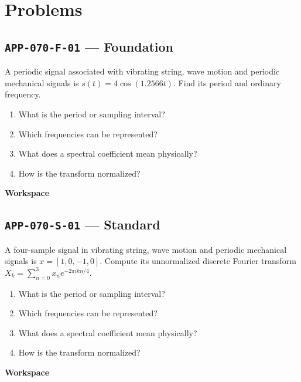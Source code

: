 \documentclass[11pt]{book}
\newcommand{\pid}[1]{\texttt{#1}}
\newcommand{\workspace}{\par\vspace{0.7in}\hrulefill\par\vspace{0.55in}\hrulefill\par}
\begin{document}
\section*{Problems}
\subsection*{\pid{APP-070-F-01} — Foundation}
\begin{problembox}
A periodic signal associated with vibrating string, wave motion and periodic mechanical signals is $s(t)=4\cos(1.2566t)$. Find its period and ordinary frequency.
\end{problembox}
\begin{promptbox}\begin{enumerate}
\item What is the period or sampling interval?
\item Which frequencies can be represented?
\item What does a spectral coefficient mean physically?
\item How is the transform normalized?
\end{enumerate}\end{promptbox}
\textbf{Workspace}\workspace
{}
\subsection*{\pid{APP-070-S-01} — Standard}
\begin{problembox}
A four-sample signal in vibrating string, wave motion and periodic mechanical signals is $x=[1,0,-1,0]$. Compute its unnormalized discrete Fourier transform $X_k=\sum_{n=0}^3 x_ne^{-2\pi i kn/4}$.
\end{problembox}
\begin{promptbox}\begin{enumerate}
\item What is the period or sampling interval?
\item Which frequencies can be represented?
\item What does a spectral coefficient mean physically?
\item How is the transform normalized?
\end{enumerate}\end{promptbox}
\textbf{Workspace}\workspace
{}
\end{document}
